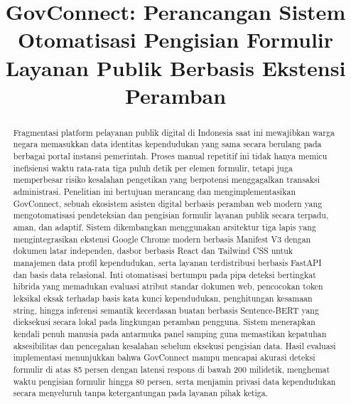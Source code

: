 \documentclass[conference]{IEEEtran}
\begin{document}
\title{GovConnect: Perancangan Sistem Otomatisasi Pengisian Formulir Layanan Publik Berbasis Ekstensi Peramban}

\author{
    \and
}

\maketitle

\begin{abstract}
Fragmentasi platform pelayanan publik digital di Indonesia saat ini mewajibkan warga negara memasukkan data identitas kependudukan yang sama secara berulang pada berbagai portal instansi pemerintah. Proses manual repetitif ini tidak hanya memicu inefisiensi waktu rata-rata tiga puluh detik per elemen formulir, tetapi juga memperbesar risiko kesalahan pengetikan yang berpotensi menggagalkan transaksi administrasi. Penelitian ini bertujuan merancang dan mengimplementasikan GovConnect, sebuah ekosistem asisten digital berbasis peramban web modern yang mengotomatisasi pendeteksian dan pengisian formulir layanan publik secara terpadu, aman, dan adaptif. Sistem dikembangkan menggunakan arsitektur tiga lapis yang mengintegrasikan ekstensi Google Chrome modern berbasis Manifest V3 dengan dokumen latar independen, dasbor berbasis React dan Tailwind CSS untuk manajemen data profil kependudukan, serta layanan terdistribusi berbasis FastAPI dan basis data relasional. Inti otomatisasi bertumpu pada pipa deteksi bertingkat hibrida yang memadukan evaluasi atribut standar dokumen web, pencocokan token leksikal eksak terhadap basis kata kunci kependudukan, penghitungan kesamaan string, hingga inferensi semantik kecerdasan buatan berbasis Sentence-BERT yang dieksekusi secara lokal pada lingkungan peramban pengguna. Sistem menerapkan kendali penuh manusia pada antarmuka panel samping guna memastikan kepatuhan aksesibilitas dan pencegahan kesalahan sebelum eksekusi pengisian data. Hasil evaluasi implementasi menunjukkan bahwa GovConnect mampu mencapai akurasi deteksi formulir di atas 85 persen dengan latensi respons di bawah 200 milidetik, menghemat waktu pengisian formulir hingga 80 persen, serta menjamin privasi data kependudukan secara menyeluruh tanpa ketergantungan pada layanan pihak ketiga.
\end{abstract}
\end{document}
